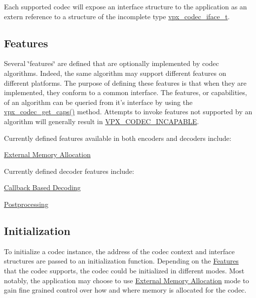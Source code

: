 Each supported codec will expose an interface structure to the application as an {\ttfamily extern} reference to a structure of the incomplete type \hyperlink{group__codec_gad654f3da60151f5dfef70aca00ef1e9e}{vpx\-\_\-codec\-\_\-iface\-\_\-t}.\hypertarget{usage_usage_features}{}\subsection{Features}\label{usage_usage_features}
Several \char`\"{}features\char`\"{} are defined that are optionally implemented by codec algorithms. Indeed, the same algorithm may support different features on different platforms. The purpose of defining these features is that when they are implemented, they conform to a common interface. The features, or capabilities, of an algorithm can be queried from it's interface by using the \hyperlink{group__codec_ga43adff58759093401235fb99247c82b8}{vpx\-\_\-codec\-\_\-get\-\_\-caps()} method. Attempts to invoke features not supported by an algorithm will generally result in \hyperlink{group__codec_ggada1084710837ad363b92f2379dd2b8d2a4470784ba5a3ef84dc0697d5489dd292}{V\-P\-X\-\_\-\-C\-O\-D\-E\-C\-\_\-\-I\-N\-C\-A\-P\-A\-B\-L\-E}.

Currently defined features available in both encoders and decoders include\-:
\begin{DoxyItemize}
\item \hyperlink{usage_xma}{External Memory Allocation}
\end{DoxyItemize}

Currently defined decoder features include\-:
\begin{DoxyItemize}
\item \hyperlink{usage_decode_usage_cb}{Callback Based Decoding}
\item \hyperlink{usage_decode_usage_postproc}{Postprocessing}
\end{DoxyItemize}\hypertarget{usage_usage_init}{}\subsection{Initialization}\label{usage_usage_init}
To initialize a codec instance, the address of the codec context and interface structures are passed to an initialization function. Depending on the \hyperlink{usage_usage_features}{Features} that the codec supports, the codec could be initialized in different modes. Most notably, the application may choose to use \hyperlink{usage_xma}{External Memory Allocation} mode to gain fine grained control over how and where memory is allocated for the codec.

